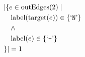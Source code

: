 \begin{align*}
&|\{e \in \mathrm{outEdges}(2)  \mid \\
&\quad \mathrm{label}(\mathrm{target}(e)) \in \{ \text{`\texttt{N}'} \}\\
&\quad \wedge\\
&\quad \mathrm{label}(e) \in \{ \text{`\texttt{-}'} \}\\
&\}| = 1
\end{align*}

